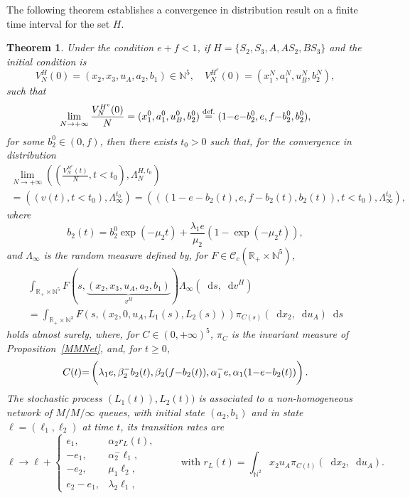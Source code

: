 \documentclass[english]{amsart}
\newcommand{\N}{\ensuremath{\mathbb{N}}}
\newcommand{\R}{\ensuremath{\mathbb{R}}}
\newcommand{\diff}{\mathop{}\mathopen{}\mathrm{d}}
\newcommand{\cal}[1]{\ensuremath{\mathcal{#1}}}
\newcommand\steq[1]{\stackrel{\text{\rm #1.}}{=}}
\newtheorem{theorem}[proposition]{Theorem}
\numberwithin{proposition}{section}
\begin{document}
The following theorem establishes a convergence in distribution  result on a finite time interval  for the set $H$.
\begin{theorem}\label{ThM1L}
Under the condition $e{+}f{<}1$, if $H{=}\{{ S}_2,{ S}_3, { A},  { AS_2}, { BS_3}\}$ and the initial condition is 
\[
V_N^H(0)=(x_2,x_3,u_A,a_2,b_1)\in\N^5, \quad V_N^{H^c}(0)=(x_1^N,a_1^N,u_B^N,b_2^N),
\]
such that 
\[
\lim_{N\to+\infty}\frac{V_N^{H^c}(0)}{N}=(x_1^0,a_1^0,u_B^0,b_2^0)\steq{def}(1{-}e{-}b_2^0,e,f{-}b_2^0,b_2^0),
\]
for some $b_2^0{\in}(0,f)$, then there exists $t_0{>}0$ such that, for the convergence in distribution
\begin{multline}\label{CVWL}
\lim_{N\to+\infty}\left(\left(\frac{V_N^{H^c}(t)}{N},t{<}t_0\right),\Lambda^{H,t_0}_N\right) \\=\left((v(t),t{<}t_0),\Lambda^{t_0}_{\infty}\right)=
\left(\left((1{-}e{-}{b}_2(t),e,f{-}{b}_2(t),{b}_2(t)), t{<}t_0\right),\Lambda^{t_0}_\infty\right),
\end{multline}
where
\[
{b}_2(t)=b_2^0\exp(-\mu_2 t)+\frac{\lambda_1 e}{\mu_2}\left(1{-}\exp(-\mu_2 t)\right),
\]
 and $\Lambda_\infty$ is the random measure defined by, for $F{\in}{\cal C}_c(\R_+{\times}\N^5)$, 
\begin{multline*}
\int_{\R_+{\times}\N^5} F(s,\underbrace{(x_2,x_3,u_A,a_2,b_1)}_{v^H})\Lambda_{\infty}(\diff s, \diff v^H)\\ =\int_{\R_+{\times}\N^3} F(s,(x_2,0,u_A,L_{1}(s),L_{2}(s)))\pi_{C(s)}(\diff x_2,\diff u_A)\diff s
\end{multline*}
holds almost surely, where, for $C{\in}(0,{+}\infty)^5$,  $\pi_{C}$ is the invariant measure of Proposition~\ref{MMNet}, and, for $t{\ge}0$, 
\begin{equation}\label{eqCt}
C(t){=}\left(\rule{0mm}{5mm}\lambda_1e,\beta_2^-{b}_2(t),\beta_2(f{-}{b}_2(t)),\alpha_1^-e,\alpha_1(1{-}e{-}{b}_2(t))\right).
\end{equation}
The stochastic process $(L_1(t)),L_2(t))$ is associated to a {\em non-homogeneous network} of $M/M/\infty$ queues, with initial state $(a_2,b_1)$ and in state $\ell{=}(\ell_1,\ell_2)$ at time $t$, its transition rates are 
\begin{equation}\label{SlowTrans}
    \ell{\longrightarrow}   \ell {+} \begin{cases}
\scriptstyle{e_{1}}, &\scriptstyle{\alpha_2r_L(t)},\\
\scriptstyle{{-}e_{1}}, &\scriptstyle{\alpha_2^-\ell_1},\\
\scriptstyle{{-}e_{2}}, &\scriptstyle{\mu_1\ell_2},\\
\scriptstyle{e_{2}{-}e_{1}}, &\scriptstyle{\lambda_2\ell_1},
   \end{cases}
\qquad   \text{ with }   r_L(t)=\int_{\N^2} x_2u_A\pi_{C(t)}(\diff x_2,\diff u_A).
\end{equation}
\end{theorem}
\end{document}
